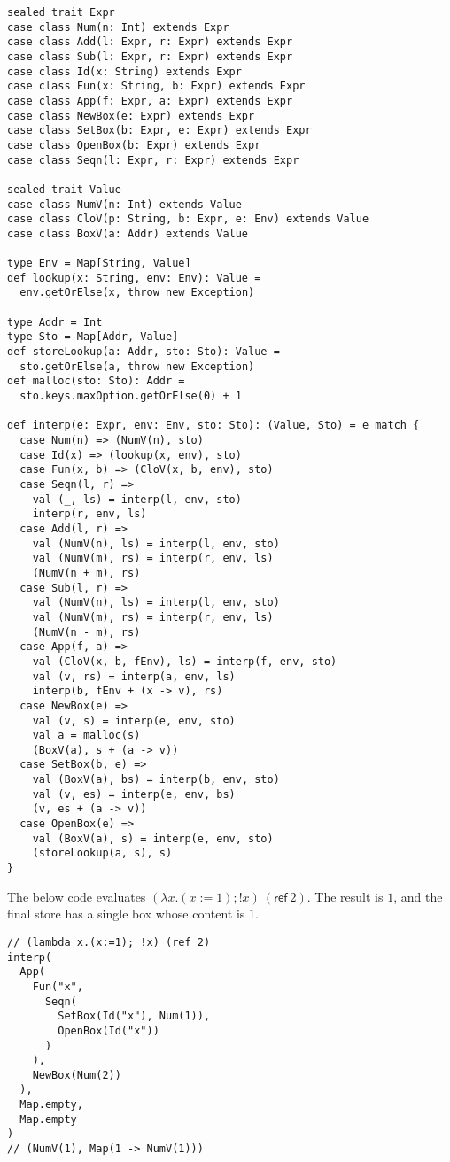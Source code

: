 \begin{verbatim}
sealed trait Expr
case class Num(n: Int) extends Expr
case class Add(l: Expr, r: Expr) extends Expr
case class Sub(l: Expr, r: Expr) extends Expr
case class Id(x: String) extends Expr
case class Fun(x: String, b: Expr) extends Expr
case class App(f: Expr, a: Expr) extends Expr
case class NewBox(e: Expr) extends Expr
case class SetBox(b: Expr, e: Expr) extends Expr
case class OpenBox(b: Expr) extends Expr
case class Seqn(l: Expr, r: Expr) extends Expr

sealed trait Value
case class NumV(n: Int) extends Value
case class CloV(p: String, b: Expr, e: Env) extends Value
case class BoxV(a: Addr) extends Value

type Env = Map[String, Value]
def lookup(x: String, env: Env): Value =
  env.getOrElse(x, throw new Exception)

type Addr = Int
type Sto = Map[Addr, Value]
def storeLookup(a: Addr, sto: Sto): Value =
  sto.getOrElse(a, throw new Exception)
def malloc(sto: Sto): Addr =
  sto.keys.maxOption.getOrElse(0) + 1

def interp(e: Expr, env: Env, sto: Sto): (Value, Sto) = e match {
  case Num(n) => (NumV(n), sto)
  case Id(x) => (lookup(x, env), sto)
  case Fun(x, b) => (CloV(x, b, env), sto)
  case Seqn(l, r) =>
    val (_, ls) = interp(l, env, sto)
    interp(r, env, ls)
  case Add(l, r) =>
    val (NumV(n), ls) = interp(l, env, sto)
    val (NumV(m), rs) = interp(r, env, ls)
    (NumV(n + m), rs)
  case Sub(l, r) =>
    val (NumV(n), ls) = interp(l, env, sto)
    val (NumV(m), rs) = interp(r, env, ls)
    (NumV(n - m), rs)
  case App(f, a) =>
    val (CloV(x, b, fEnv), ls) = interp(f, env, sto)
    val (v, rs) = interp(a, env, ls)
    interp(b, fEnv + (x -> v), rs)
  case NewBox(e) =>
    val (v, s) = interp(e, env, sto)
    val a = malloc(s)
    (BoxV(a), s + (a -> v))
  case SetBox(b, e) =>
    val (BoxV(a), bs) = interp(b, env, sto)
    val (v, es) = interp(e, env, bs)
    (v, es + (a -> v))
  case OpenBox(e) =>
    val (BoxV(a), s) = interp(e, env, sto)
    (storeLookup(a, s), s)
}
\end{verbatim}

The below code evaluates \( (\lambda x.(x:=1);!x)\ (\textsf{ref}\ 2) \). The
result is \(1\), and the final store has a single box whose content is \(1\).

\begin{verbatim}
// (lambda x.(x:=1); !x) (ref 2)
interp(
  App(
    Fun("x",
      Seqn(
        SetBox(Id("x"), Num(1)),
        OpenBox(Id("x"))
      )
    ),
    NewBox(Num(2))
  ),
  Map.empty,
  Map.empty
)
// (NumV(1), Map(1 -> NumV(1)))
\end{verbatim}

